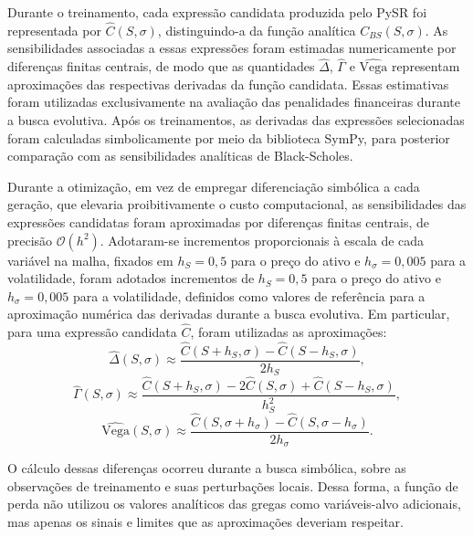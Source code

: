 Durante o treinamento, cada expressão candidata produzida pelo PySR foi representada por \(\widehat C(S,\sigma)\), distinguindo-a da função analítica \(C_{BS}(S,\sigma)\). As sensibilidades associadas a essas expressões foram estimadas numericamente por diferenças finitas centrais, de modo que as quantidades \(\widehat\Delta\), \(\widehat\Gamma\) e \(\widehat{\mathrm{Vega}}\) representam aproximações das respectivas derivadas da função candidata. Essas estimativas foram utilizadas exclusivamente na avaliação das penalidades financeiras durante a busca evolutiva. Após os treinamentos, as derivadas das expressões selecionadas foram calculadas simbolicamente por meio da biblioteca SymPy, para posterior comparação com as sensibilidades analíticas de Black-Scholes.

Durante a otimização, em vez de empregar diferenciação simbólica a cada geração, que elevaria proibitivamente o custo computacional, as sensibilidades das expressões candidatas foram aproximadas por diferenças finitas centrais, de precisão $\mathcal{O}(h^2)$. Adotaram-se incrementos proporcionais à escala de cada variável na malha, fixados em $h_S=0{,}5$ para o preço do ativo e $h_{\sigma}=0{,}005$ para a volatilidade, foram adotados incrementos de \(h_S=0{,}5\) para o preço do ativo e \(h_\sigma=0{,}005\) para a volatilidade, definidos como valores de referência para a aproximação numérica das derivadas durante a busca evolutiva.  Em particular, para uma expressão candidata $\widehat C$, foram utilizadas as aproximações:
\begin{equation}
    \widehat\Delta(S,\sigma)\approx
    \frac{\widehat C(S+h_S,\sigma)-\widehat C(S-h_S,\sigma)}{2h_S},
\end{equation}
\begin{equation}
    \widehat\Gamma(S,\sigma)\approx
    \frac{\widehat C(S+h_S,\sigma)-2\widehat C(S,\sigma)+\widehat C(S-h_S,\sigma)}{h_S^2},
\end{equation}
\begin{equation}
    \widehat{\mathrm{Vega}}(S,\sigma)\approx
    \frac{\widehat C(S,\sigma+h_{\sigma})-\widehat C(S,\sigma-h_{\sigma})}{2h_{\sigma}}.
\end{equation}



O cálculo dessas diferenças ocorreu durante a busca simbólica, sobre as observações de treinamento e suas perturbações locais. Dessa forma, a função de perda não utilizou os valores analíticos das gregas como variáveis-alvo adicionais, mas apenas os sinais e limites que as aproximações deveriam respeitar.


